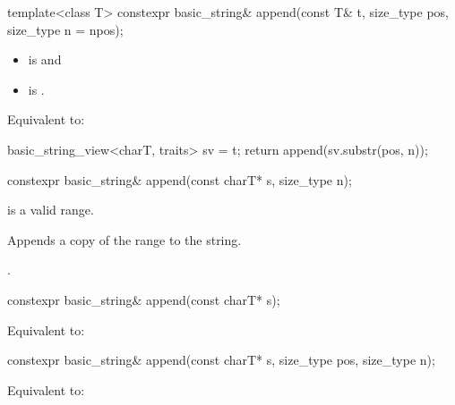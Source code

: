 %
\begin{itemdecl}
template<class T>
  constexpr basic_string& append(const T& t, size_type pos, size_type n = npos);
\end{itemdecl}

\begin{itemdescr}
\pnum
\constraints
\begin{itemize}
\item
{} is
 and
\item
{} is
.
\end{itemize}

\pnum
\effects
Equivalent to:
\begin{codeblock}
basic_string_view<charT, traits> sv = t;
return append(sv.substr(pos, n));
\end{codeblock}
\end{itemdescr}

%
\begin{itemdecl}
constexpr basic_string& append(const charT* s, size_type n);
\end{itemdecl}

\begin{itemdescr}
\pnum
\expects
{} is a valid range.

\pnum
\effects
Appends a copy of the range  to the string.

\pnum
\returns
{}.
\end{itemdescr}

%
\begin{itemdecl}
constexpr basic_string& append(const charT* s);
\end{itemdecl}

\begin{itemdescr}
\pnum
\effects
Equivalent to: 
\end{itemdescr}

%
\begin{itemdecl}
constexpr basic_string& append(const charT* s, size_type pos, size_type n);
\end{itemdecl}

\begin{itemdescr}
\pnum
\effects
Equivalent to:
\end{itemdescr}

